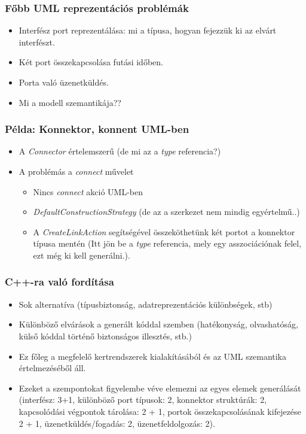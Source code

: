 \documentclass[11pt]{beamer}
\begin{document}
\begin{frame}[fragile]	
	\frametitle{Főbb UML reprezentációs problémák}	
	\begin{itemize}
	\item Interfész port reprezentálása: mi a típusa, hogyan fejezzük ki az elvárt interfészt.
	\item Két port összekapcsolása futási időben.
	\item Porta való üzenetküldés.
	\item Mi a modell szemantikája??
	\end{itemize}
	
\end{frame}

\begin{frame}
	\frametitle{Példa: Konnektor, konnent UML-ben}
	\begin{itemize}
	\item A \textit{Connector} értelemszerű (de mi az a \textit{type} referencia?)
	\item A problémás a \textit{connect} művelet
		\begin{itemize}
		\item Nincs \textit{connect} akció UML-ben
		\item \textit{DefaultConstructionStrategy}  (de az a szerkezet nem mindig egyértelmű..)
		\item A \textit{CreateLinkAction} segítségével összeköthetünk két portot a konnektor típusa mentén (Itt jön be a \textit{type} referencia, mely egy asszociációnak felel, ezt még ki kell generálni.).
		\end{itemize}
	\end{itemize}
\end{frame}


\begin{frame}[fragile]	
	\frametitle{C++-ra való fordítása}	
	\begin{itemize}
	\item Sok alternatíva (típusbiztonság, adatreprezentációs különbségek, stb)
	\item Különböző elvárások a generált kóddal szemben (hatékonyság, olvashatóság, külső kóddal történő biztonságos illesztés, stb.)
	\item Ez főleg a megfelelő kertrendszerek kialakításából és az UML szemantika értelmezéséből áll.
	\item Ezeket a szempontokat figyelembe véve elemezni az egyes elemek generálását (interfész: 3+1, különböző port típusok: 2, konnektor struktúrák: 2,  kapcsolódási végpontok tárolása: 2 + 1,  portok összekapcsolásának kifejezése 2 + 1, üzenetküldés/fogadás: 2, üzenetfeldolgozás: 2).
	\end{itemize}
	
\end{frame}
\end{document}

